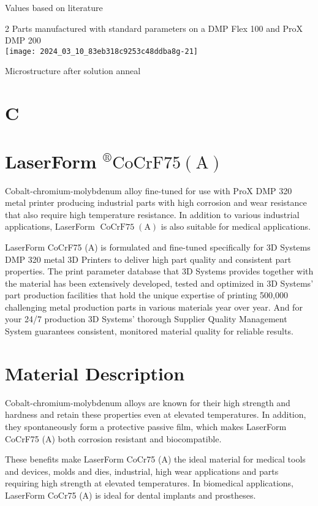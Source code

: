 \documentclass[10pt]{article}
\begin{document}
Values based on literature

2 Parts manufactured with standard parameters on a DMP Flex 100 and ProX DMP 200\\
\texttt{[image: 2024\_03\_10\_83eb318c9253c48ddba8g-21]}

Microstructure after solution anneal

\section*{C}
\section*{LaserForm ${ }^{\circledR} \mathrm{CoCrF75}(\mathrm{A})$}
Cobalt-chromium-molybdenum alloy fine-tuned for use with ProX DMP 320 metal printer producing industrial parts with high corrosion and wear resistance that also require high temperature resistance. In addition to various industrial applications, LaserForm $\operatorname{CoCrF75}(\mathrm{A})$ is also suitable for medical applications.

LaserForm CoCrF75 (A) is formulated and fine-tuned specifically for 3D Systems DMP 320 metal 3D Printers to deliver high part quality and consistent part properties. The print parameter database that 3D Systems provides together with the material has been extensively developed, tested and optimized in 3D Systems' part production facilities that hold the unique expertise of printing 500,000 challenging metal production parts in various materials year over year. And for your 24/7 production 3D Systems' thorough Supplier Quality Management System guarantees consistent, monitored material quality for reliable results.

\section*{Material Description}
Cobalt-chromium-molybdenum alloys are known for their high strength and hardness and retain these properties even at elevated temperatures. In addition, they spontaneously form a protective passive film, which makes LaserForm CoCrF75 (A) both corrosion resistant and biocompatible.

These benefits make LaserForm CoCr75 (A) the ideal material for medical tools and devices, molds and dies, industrial, high wear applications and parts requiring high strength at elevated temperatures. In biomedical applications, LaserForm CoCr75 (A) is ideal for dental implants and prostheses.
\end{document}
